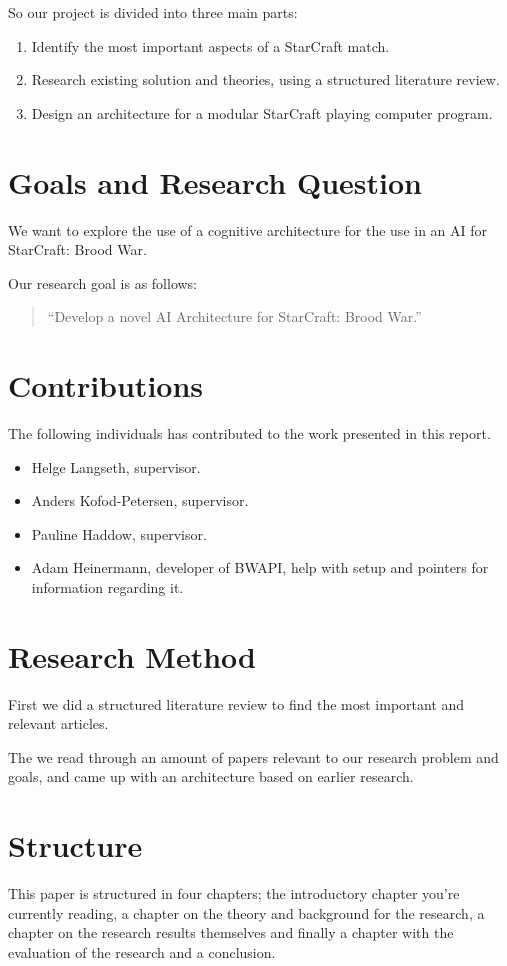 So our project is divided into three main parts:
\begin{enumerate}
  \item Identify the most important aspects of a StarCraft match.
  \item Research existing solution and theories, using a structured literature
review.
  \item Design an architecture for a modular StarCraft playing computer program.
\end{enumerate}

\section{Goals and Research Question}
We want to explore the use of a cognitive architecture for the use in an AI for
StarCraft: Brood War.

Our research goal is as follows:
\begin{quote}
 ``Develop a novel AI Architecture for StarCraft: Brood War.''
\end{quote}


\section{Contributions}
The following individuals has contributed to the work presented in this report.

\begin{itemize}
 \item Helge Langseth, supervisor.
 \item Anders Kofod-Petersen, supervisor.
 \item Pauline Haddow, supervisor.
 \item Adam Heinermann, developer of BWAPI, help with setup and pointers for
information regarding it.
\end{itemize}


\section{Research Method}
First we did a structured literature review to find the most important and
relevant articles.

The we read through an amount of papers relevant to our research problem and
goals, and came up with an architecture based on earlier research.


\section{Structure}
This paper is structured in four chapters; the introductory chapter you're
currently reading, a chapter on the theory and background for the research, a
chapter on the research results themselves and finally a chapter with the
evaluation of the research and a conclusion.
